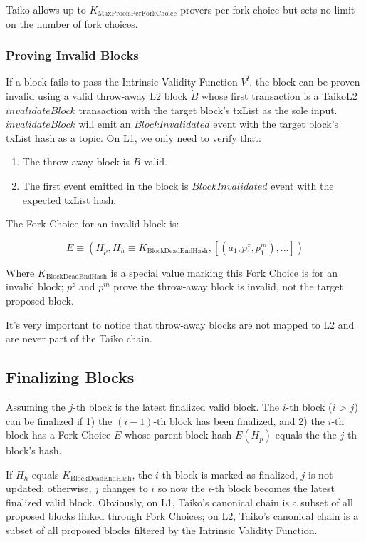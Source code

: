 \documentclass[9pt,oneside]{amsart}
\begin{document}
\begin{multicols}{2}
Taiko allows up to $K_{\mathrm{MaxProofsPerForkChoice}}$ provers per fork choice but sets no limit on the number of fork choices.

\subsubsection{Proving Invalid Blocks} \label{sec:provinginvaid}

If a block fails to pass the Intrinsic Validity Function $V^l$, the block can be proven invalid using a valid throw-away L2 block $\dot{B}$ whose first transaction is a TaikoL2 $invalidateBlock$ transaction with the target block's txList as the sole input. $invalidateBlock$ will emit an $BlockInvalidated$ event with the target block's txList hash as a topic. On L1, we only need to verify that:

\begin{enumerate}
\item The throw-away block is $\dot{B}$ valid.
\item The first event emitted in the block is $BlockInvalidated$ event with the expected txList hash. 
\end{enumerate}

The Fork Choice for an invalid block is:

\begin{equation}
E \equiv (H_p, H_h \equiv K_{\mathrm{BlockDeadEndHash}}, [(a_1, p^{z}_1, p^{m}_1),...])
\end{equation}

Where $K_{\mathrm{BlockDeadEndHash}}$ is a special value marking this Fork Choice is for an invalid block; $p^{z}$ and  $p^{m}$ prove the throw-away block is invalid, not the target proposed block.

It's very important to notice that throw-away blocks are not mapped to L2 and are never part of the Taiko chain.

\subsection{Finalizing Blocks}\label{sec:finalizing}

Assuming the $j$-th block is the latest finalized valid block. The $i$-th block ($i$ > $j$) can be finalized if 1) the $(i-1)$-th block has been finalized, and 2) the $i$-th block has a Fork Choice $E$ whose parent block hash $E(H_p)$ equals the the $j$-th block's hash.

If $H_h$ equals $K_{\mathrm{BlockDeadEndHash}}$, the $i$-th block is marked as finalized, $j$ is not updated; otherwise,  $j$ changes to $i$ so now the $i$-th block becomes the latest finalized valid block. Obviously, on L1, Taiko's canonical chain is a subset of all proposed blocks linked through Fork Choices; on L2, Taiko's canonical chain is a subset of all proposed blocks filtered by the Intrinsic Validity Function.


\end{multicols}
\end{document}

